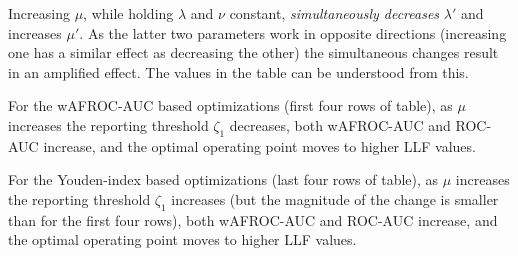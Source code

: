 \documentclass[
]{book}
\begin{document}
\begin{table}[H]

\caption{\label{tab:optim-op-point-table3}Summary of optimization results for $\nu = 1$, $\lambda = 1$ and different values of $\mu$. The wAFROC column always displays wAFROC-AUC, even though the optimized quantity may the Youden-index, as in the last four rows.}
\centering
{}
\end{table}

Increasing \(\mu\), while holding \(\lambda\) and \(\nu\) constant, \emph{simultaneously decreases} \(\lambda'\) and increases \(\mu'\). As the latter two parameters work in opposite directions (increasing one has a similar effect as decreasing the other) the simultaneous changes result in an amplified effect. The values in the table can be understood from this.

For the wAFROC-AUC based optimizations (first four rows of table), as \(\mu\) increases the reporting threshold \(\zeta_1\) decreases, both wAFROC-AUC and ROC-AUC increase, and the optimal operating point moves to higher LLF values.

For the Youden-index based optimizations (last four rows of table), as \(\mu\) increases the reporting threshold \(\zeta_1\) increases (but the magnitude of the change is smaller than for the first four rows), both wAFROC-AUC and ROC-AUC increase, and the optimal operating point moves to higher LLF values.
\end{document}

